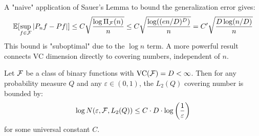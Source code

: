 A "naive" application of Sauer's Lemma to bound the generalization error gives:
$$
\mathbb{E}[\sup_{f \in \mathcal{F}} \left| P_n f-Pf \right|] \le C \sqrt{\frac{\log \Pi_{\mathcal{F}}(n)}{n}} \le C \sqrt{\frac{\log( (en/D)^D )}{n}} = C' \sqrt{\frac{D \log(n/D)}{n}}
$$
This bound is "suboptimal" due to the $\log n$ term. A more powerful result connects VC dimension directly to covering numbers, independent of $n$.

\begin{thm}
Let $\mathcal{F}$ be a class of binary functions with $\text{VC}(\mathcal{F}) = D < \infty$. Then for any probability measure $Q$ and any $\varepsilon \in (0, 1)$, the $L_2(Q)$ covering number is bounded by:
$$
\log N(\varepsilon, \mathcal{F}, L_2(Q)) \le C \cdot D \cdot \log\left(\frac{1}{\varepsilon}\right)
$$
for some universal constant $C$.
\end{thm}

